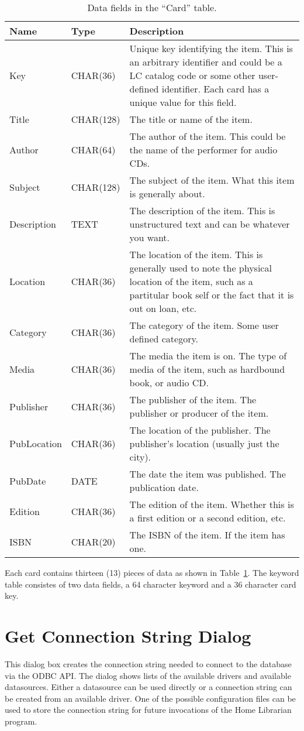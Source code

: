 \begin{table}[h]
\begin{tabular}{|l|l|p{3in}|}
\hline
Name&Type&Description \\
\hline
Key&CHAR(36)&Unique key identifying the item. This is an arbitrary
identifier and could be a LC catalog code or some other user-defined
identifier.  Each card has a unique value for this field.\\
Title&CHAR(128)&The title or name of the item.\\
Author&CHAR(64)&The author of the item. This could be the name of the
performer for audio CDs.\\
Subject&CHAR(128)&The subject of the item.  What this item is generally
about. \\
Description&TEXT&The description of the item.  This is unstructured text
and can be whatever you want.\\
Location&CHAR(36)&The location of the item. This is generally used to
note the physical location of the item, such as a partitular book self
or the fact that it is out on loan, etc.\\
Category&CHAR(36)&The category of the item. Some user defined category.\\
Media&CHAR(36)&The media the item is on. The type of media of the item,
such as hardbound book, or audio CD.\\
Publisher&CHAR(36)&The publisher of the item. The publisher or producer
of the item.\\
PubLocation&CHAR(36)&The location of the publisher. The publisher's
location (usually just the city).\\
PubDate&DATE&The date the item was published. The publication date.\\
Edition&CHAR(36)&The edition of the item. Whether this is a first
edition or a second edition, etc.\\
ISBN&CHAR(20)&The ISBN of the item. If the item has one.\\
\hline
\end{tabular}
\caption{Data fields in the ``Card'' table.}
\label{tab:ref:cardfields}
\end{table}
Each card contains thirteen (13) pieces of data as shown in
Table~\ref{tab:ref:cardfields}. The keyword table consistes of two data
fields, a 64 character keyword and a 36 character card key.

\section{Get Connection String Dialog}
This dialog box creates the connection string needed to connect to the
database via the ODBC API. The dialog shows lists of the available
drivers and available datasources.  Either a datasource can be used
directly or a connection string can be created from an available
driver. One of the possible configuration files can be used to store
the connection string for future invocations of the Home Librarian
program.
